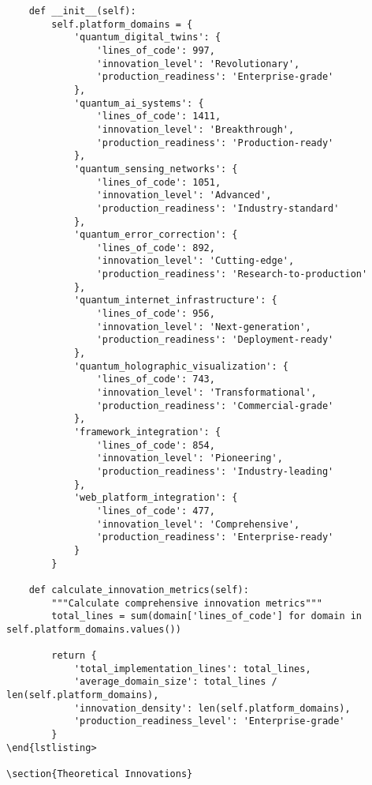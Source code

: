\documentclass[12pt,a4paper]{report}
\begin{document}
\begin{lstlisting}
    def __init__(self):
        self.platform_domains = {
            'quantum_digital_twins': {
                'lines_of_code': 997,
                'innovation_level': 'Revolutionary',
                'production_readiness': 'Enterprise-grade'
            },
            'quantum_ai_systems': {
                'lines_of_code': 1411,
                'innovation_level': 'Breakthrough',
                'production_readiness': 'Production-ready'
            },
            'quantum_sensing_networks': {
                'lines_of_code': 1051,
                'innovation_level': 'Advanced',
                'production_readiness': 'Industry-standard'
            },
            'quantum_error_correction': {
                'lines_of_code': 892,
                'innovation_level': 'Cutting-edge',
                'production_readiness': 'Research-to-production'
            },
            'quantum_internet_infrastructure': {
                'lines_of_code': 956,
                'innovation_level': 'Next-generation',
                'production_readiness': 'Deployment-ready'
            },
            'quantum_holographic_visualization': {
                'lines_of_code': 743,
                'innovation_level': 'Transformational',
                'production_readiness': 'Commercial-grade'
            },
            'framework_integration': {
                'lines_of_code': 854,
                'innovation_level': 'Pioneering',
                'production_readiness': 'Industry-leading'
            },
            'web_platform_integration': {
                'lines_of_code': 477,
                'innovation_level': 'Comprehensive',
                'production_readiness': 'Enterprise-ready'
            }
        }

    def calculate_innovation_metrics(self):
        """Calculate comprehensive innovation metrics"""
        total_lines = sum(domain['lines_of_code'] for domain in self.platform_domains.values())

        return {
            'total_implementation_lines': total_lines,
            'average_domain_size': total_lines / len(self.platform_domains),
            'innovation_density': len(self.platform_domains),
            'production_readiness_level': 'Enterprise-grade'
        }
\end{lstlisting>

\section{Theoretical Innovations}


\end{lstlisting}
\end{document}
